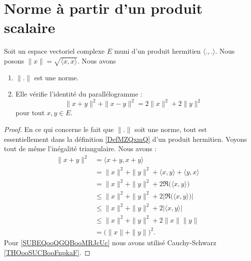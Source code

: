 \section{Norme à partir d'un produit scalaire}


\begin{proposition}        \label{PROPooSSYJooHAXAnC}
	Soit un espace vectoriel complexe \( E\) muni d'un produit hermitien \( \langle ., .\rangle \). Nous posons \( \| x \|=\sqrt{ \langle x, x\rangle  }\). Nous avons
	\begin{enumerate}
		\item
		      \( \| . \|\) est une norme.
		\item
		      Elle vérifie l'identité du parallélogramme :
		      \begin{equation}
			      \| x+y \|^2+\| x-y \|^2=2\| x \|^2+2\| y \|^2
		      \end{equation}
		      pour tout \( x,y\in E\).
	\end{enumerate}
\end{proposition}

\begin{proof}
	En ce qui concerne le fait que \( \| . \|\) soit une norme, tout est essentiellement dans la définition \ref{DefMZQxmQ} d'un produit hermitien. Voyons tout de même l'inégalité triangulaire. Nous avons :
	\begin{subequations}
		\begin{align}
			\| x+y \|^2 & =\langle x+y, x+y\rangle                                            \\
			            & =\| x \|^2+\| y \|^2+\langle x, y\rangle +\langle y, x\rangle       \\
			            & =\| x \|^2+\| y \|^2+2\Re\big( \langle x, y\rangle  \big)           \\
			            & \leq\| x \|^2+\| y \|^2+2|\Re\big( \langle x, y\rangle  \big)|      \\
			            & \leq\| x \|^2+\| y \|^2+2| \langle x, y\rangle  |                   \\
			            & \leq \| x \|^2+\| y \|^2+2\| x \|\| y \|\label{SUBEQooQGQBooMRJcUc} \\
			            & =\big( \| x \|+\| y \| \big)^2.
		\end{align}
	\end{subequations}
	Pour \eqref{SUBEQooQGQBooMRJcUc} nous avons utilisé Cauchy-Schwarz \ref{THOooSUCBooFnpkaF}.
\end{proof}

